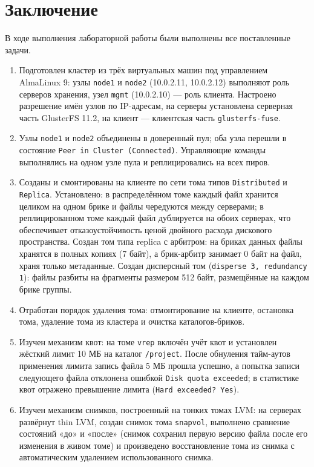\section*{Заключение}

В ходе выполнения лабораторной работы были выполнены все поставленные 
задачи.

\begin{enumerate}
    \item Подготовлен кластер из трёх виртуальных машин под управлением
    AlmaLinux 9: узлы \texttt{node1} и \texttt{node2} (10.0.2.11, 10.0.2.12)
    выполняют роль серверов хранения, узел \texttt{mgmt} (10.0.2.10) ---
    роль клиента. Настроено разрешение имён узлов по IP-адресам,
    на серверы установлена серверная часть GlusterFS 11.2, на клиент ---
    клиентская часть \texttt{glusterfs-fuse}.
    \item Узлы \texttt{node1} и \texttt{node2} объединены в доверенный
    пул; оба узла перешли в состояние \texttt{Peer in Cluster (Connected)}.
    Управляющие команды выполнялись на одном узле пула и реплицировались
    на всех пиров.
    \item Созданы и смонтированы на клиенте по сети тома типов
    \texttt{Distributed} и \texttt{Replica}. Установлено: в
    распределённом томе каждый файл хранится целиком на одном брике
    и файлы чередуются между серверами; в реплицированном томе каждый файл
    дублируется на обоих серверах, что обеспечивает отказоустойчивость
    ценой двойного расхода дискового пространства. Создан том типа
    replica с арбитром: на бриках данных файлы хранятся в полных
    копиях (7 байт), а брик-арбитр занимает 0 байт на файл, храня
    только метаданные. Создан дисперсный том (\texttt{disperse 3,
    redundancy 1}): файлы разбиты на фрагменты размером 512 байт,
    размещённые на каждом брике группы.
    \item Отработан порядок удаления тома: отмонтирование на клиенте,
    остановка тома, удаление тома из кластера и очистка
    каталогов-бриков.
    \item Изучен механизм квот: на томе \texttt{vrep} включён учёт
    квот и установлен жёсткий лимит 10 МБ на каталог \texttt{/project}.
    После обнуления тайм-аутов применения лимита запись файла 5 МБ
    прошла успешно, а попытка записи следующего файла отклонена
    ошибкой \texttt{Disk quota exceeded}; в статистике квот отражено
    превышение лимита (\texttt{Hard exceeded? Yes}).
    \item Изучен механизм снимков, построенный на тонких томах LVM:
    на серверах развёрнут thin LVM, создан снимок тома \texttt{snapvol},
    выполнено сравнение состояний «до» и «после» (снимок сохранил
    первую версию файла после его изменения в живом томе) и
    произведено восстановление тома из снимка с автоматическим
    удалением использованного снимка.
\end{enumerate}

